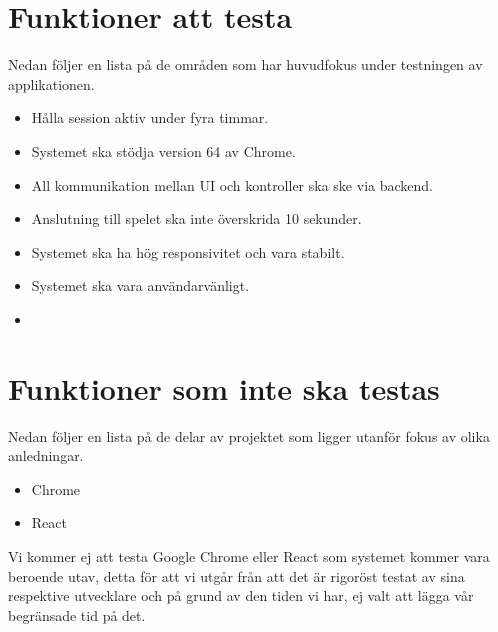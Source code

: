 \documentclass[10pt]{article}
\begin{document}
	
	
	

\section{Funktioner att testa}
	Nedan följer en lista på de områden som har huvudfokus under testningen av applikationen.
	\begin{itemize}
	\item Hålla session aktiv under fyra timmar.
	\item Systemet ska stödja version 64 av Chrome.
	\item All kommunikation mellan UI och kontroller ska ske via backend.
	\item Anslutning till spelet ska inte överskrida 10 sekunder.
	\item Systemet ska ha hög responsivitet och vara stabilt.
	\item Systemet ska vara användarvänligt.
	\item 
	\end{itemize}
	
	
	
\section{Funktioner som inte ska testas}
	Nedan följer en lista på de delar av projektet som ligger utanför fokus av olika anledningar.
	\begin{itemize}
	\item Chrome
	\item React
	\end{itemize}
	Vi kommer ej att testa Google Chrome eller React som systemet kommer vara beroende utav, detta för att vi utgår från att det är rigoröst testat av sina respektive utvecklare och på grund av den tiden vi har, ej valt att lägga vår begränsade tid på det.
\end{document}
